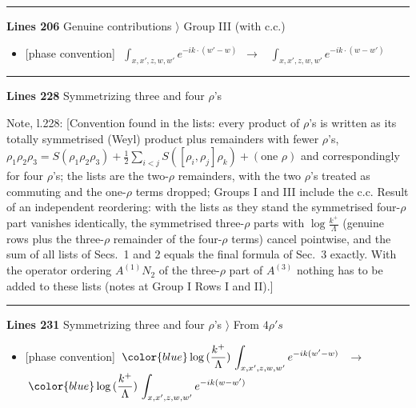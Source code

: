 \documentclass[10pt]{article}
\newenvironment{notebox}{\def\FrameCommand{{\color{notebar}\vrule width 1.5pt}\hspace{6pt}}\MakeFramed{\advance\hsize-\width\FrameRestore}\small}{\endMakeFramed}
\begin{document}
\noindent\rule{\linewidth}{0.3pt}\par\noindent\textbf{Lines 206} \quad \textsf{Genuine contributions $\rangle$ Group III (with c.c.)} \par
\begin{itemize}[leftmargin=2.2em,itemsep=1pt,topsep=2pt]
\item[\textbf{l.206}] \textsf{\small [phase convention]} $\displaystyle \,\,\int_{x,x',z,w,w'}e^{-ik\cdot(w'-w)}$\ $\longrightarrow$\ $\displaystyle \,\,\int_{x,x',z,w,w'}e^{-ik\cdot(w-w')}$
\end{itemize}
\noindent\rule{\linewidth}{0.3pt}\par\noindent\textbf{Lines 228} \quad \textsf{Symmetrizing three and four $\rho$'s}\par
\begin{notebox}\textsf{\small Note, l.228:} [Convention found in the lists: every product of $\rho$'s is written as its totally symmetrised (Weyl) product plus remainders with fewer $\rho$'s, $\rho_{1}\rho_{2}\rho_{3}=S(\rho_{1}\rho_{2}\rho_{3})+\frac12\sum_{i<j}S([\rho_{i},\rho_{j}]\rho_{k})+(\text{one }\rho)$ and correspondingly for four $\rho$'s; the lists are the two-$\rho$ remainders, with the two $\rho$'s treated as commuting and the one-$\rho$ terms dropped; Groups I and III include the c.c. Result of an independent reordering: with the lists as they stand the symmetrised four-$\rho$ part vanishes identically, the symmetrised three-$\rho$ parts with $\log\frac{k^{+}}{\Lambda}$ (genuine rows plus the three-$\rho$ remainder of the four-$\rho$ terms) cancel pointwise, and the sum of all lists of Secs.~1 and 2 equals the final formula of Sec.~3 exactly. With the operator ordering $A^{(1)}N_{2}$ of the three-$\rho$ part of $A^{(3)}$ nothing has to be added to these lists (notes at Group I Rows I and II).]\end{notebox}
\noindent\rule{\linewidth}{0.3pt}\par\noindent\textbf{Lines 231} \quad \textsf{Symmetrizing three and four $\rho$'s $\rangle$ From $4 \rho's$} \par
\begin{itemize}[leftmargin=2.2em,itemsep=1pt,topsep=2pt]
\item[\textbf{l.231}] \textsf{\small [phase convention]} $\displaystyle \,{\color{blue}\log{(\frac{k^{+}}{\Lambda})}}\,\int_{x,x',z,w,w'}e^{-ik(w'-w)}\,$\ $\longrightarrow$\ $\displaystyle \,{\color{blue}\log{(\frac{k^{+}}{\Lambda})}}\,\int_{x,x',z,w,w'}e^{-ik(w-w')}\,$
\end{itemize}
\end{document}
